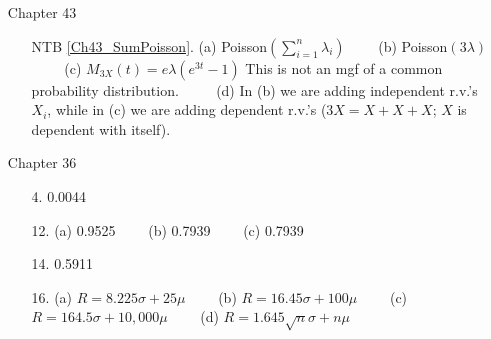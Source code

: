 \documentclass[12pt]{article}
\begin{document}
\begin{itemize}
%
%
%
\item[Chapter 43]        \label{ANS_43}
	\begin{itemize}
	\item[]
	\item[NTB \ref{Ch43_SumPoisson}.]   (a)  Poisson$(\sum_{i=1}^n \lambda_i)$ \ \ \ \ (b) Poisson$(3\lambda)$ \ \ \ \   \newline
	(c) $M_{3X}(t)=e{\lambda(e^{3t}-1)}$ This is not an mgf of a common probability distribution. 
	 \ \ \ \ \newline 
	 (d) In (b) we are adding independent r.v.'s $X_i$, while in (c) we are adding dependent r.v.'s ($3X=X+X+X$; $X$ is dependent with itself).
	\end{itemize}




\item[Chapter 36]        \label{ANS_36}
	\begin{itemize}
	\item[4.] 0.0044  
	\item[12.]  (a) 0.9525  \ \ \ \ (b) 0.7939 \ \ \ \   (c) 0.7939  
	\item[14.] 0.5911
	\item[16.] (a)  $R=8.225\sigma+25\mu$ \ \ \ \ (b) $R=16.45\sigma+100\mu$ \ \ \ \   (c) $R=164.5\sigma+10,000\mu$  \ \ \ \ (d) $R=1.645\sqrt{n}\sigma+n\mu$
	\end{itemize}


\end{itemize}
\end{document}
